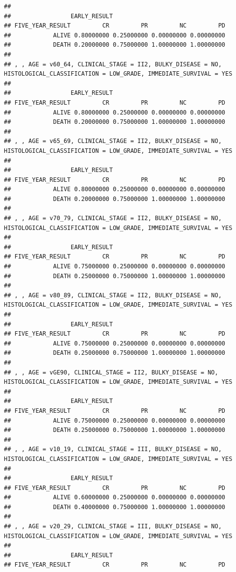 \documentclass[]{article}
\begin{document}
\begin{verbatim}
## 
##                 EARLY_RESULT
## FIVE_YEAR_RESULT         CR         PR         NC         PD
##            ALIVE 0.80000000 0.25000000 0.00000000 0.00000000
##            DEATH 0.20000000 0.75000000 1.00000000 1.00000000
## 
## , , AGE = v60_64, CLINICAL_STAGE = II2, BULKY_DISEASE = NO, HISTOLOGICAL_CLASSIFICATION = LOW_GRADE, IMMEDIATE_SURVIVAL = YES
## 
##                 EARLY_RESULT
## FIVE_YEAR_RESULT         CR         PR         NC         PD
##            ALIVE 0.80000000 0.25000000 0.00000000 0.00000000
##            DEATH 0.20000000 0.75000000 1.00000000 1.00000000
## 
## , , AGE = v65_69, CLINICAL_STAGE = II2, BULKY_DISEASE = NO, HISTOLOGICAL_CLASSIFICATION = LOW_GRADE, IMMEDIATE_SURVIVAL = YES
## 
##                 EARLY_RESULT
## FIVE_YEAR_RESULT         CR         PR         NC         PD
##            ALIVE 0.80000000 0.25000000 0.00000000 0.00000000
##            DEATH 0.20000000 0.75000000 1.00000000 1.00000000
## 
## , , AGE = v70_79, CLINICAL_STAGE = II2, BULKY_DISEASE = NO, HISTOLOGICAL_CLASSIFICATION = LOW_GRADE, IMMEDIATE_SURVIVAL = YES
## 
##                 EARLY_RESULT
## FIVE_YEAR_RESULT         CR         PR         NC         PD
##            ALIVE 0.75000000 0.25000000 0.00000000 0.00000000
##            DEATH 0.25000000 0.75000000 1.00000000 1.00000000
## 
## , , AGE = v80_89, CLINICAL_STAGE = II2, BULKY_DISEASE = NO, HISTOLOGICAL_CLASSIFICATION = LOW_GRADE, IMMEDIATE_SURVIVAL = YES
## 
##                 EARLY_RESULT
## FIVE_YEAR_RESULT         CR         PR         NC         PD
##            ALIVE 0.75000000 0.25000000 0.00000000 0.00000000
##            DEATH 0.25000000 0.75000000 1.00000000 1.00000000
## 
## , , AGE = vGE90, CLINICAL_STAGE = II2, BULKY_DISEASE = NO, HISTOLOGICAL_CLASSIFICATION = LOW_GRADE, IMMEDIATE_SURVIVAL = YES
## 
##                 EARLY_RESULT
## FIVE_YEAR_RESULT         CR         PR         NC         PD
##            ALIVE 0.75000000 0.25000000 0.00000000 0.00000000
##            DEATH 0.25000000 0.75000000 1.00000000 1.00000000
## 
## , , AGE = v10_19, CLINICAL_STAGE = III, BULKY_DISEASE = NO, HISTOLOGICAL_CLASSIFICATION = LOW_GRADE, IMMEDIATE_SURVIVAL = YES
## 
##                 EARLY_RESULT
## FIVE_YEAR_RESULT         CR         PR         NC         PD
##            ALIVE 0.60000000 0.25000000 0.00000000 0.00000000
##            DEATH 0.40000000 0.75000000 1.00000000 1.00000000
## 
## , , AGE = v20_29, CLINICAL_STAGE = III, BULKY_DISEASE = NO, HISTOLOGICAL_CLASSIFICATION = LOW_GRADE, IMMEDIATE_SURVIVAL = YES
## 
##                 EARLY_RESULT
## FIVE_YEAR_RESULT         CR         PR         NC         PD

\end{verbatim}
\end{document}
